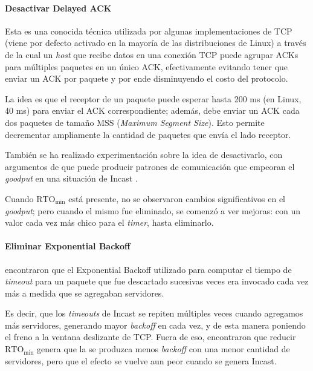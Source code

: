 \documentclass[runningheads,a4paper]{llncs}
\begin{document}
\paragraph{Desactivar Delayed ACK}

Esta es una conocida técnica utilizada por algunas implementaciones de TCP (viene por defecto activado en la mayoría de las distribuciones de Linux) a través de la cual un \textit{host} que recibe datos en una conexión TCP puede agrupar ACKs para múltiples paquetes en un único ACK, efectivamente evitando tener que enviar un ACK por paquete y por ende disminuyendo el costo del protocolo.

La idea es que el receptor de un paquete puede esperar hasta 200 ms (en Linux, 40 ms) para enviar el ACK correspondiente; además, debe enviar un ACK cada dos paquetes de tamaño MSS (\textit{Maximum Segment Size}). Esto permite decrementar ampliamente la cantidad de paquetes que envía el lado receptor.

También se ha realizado experimentación sobre la idea de desactivarlo, con argumentos de que puede producir patrones de comunicación que empeoran el \textit{goodput} en una situación de Incast \cite{Phanishayee_Throughput_2008} \cite{Vasudevan_FineGradinedRetrans_2009}.

Cuando $\text{RTO}_{\text{min}}$ está presente, no se observaron cambios significativos en el \textit{goodput}; pero cuando el mismo fue eliminado, se comenzó a ver mejoras: con un valor cada vez más chico para el \textit{timer}, hasta eliminarlo.

\paragraph{Eliminar Exponential Backoff}

\citet{Zheng_ExpBackoff_2011} encontraron que el Exponential Backoff utilizado para computar el tiempo de \textit{timeout} para un paquete que fue descartado sucesivas veces era invocado cada vez más a medida que se agregaban servidores. 

Es decir, que los \textit{timeouts} de Incast se repiten múltiples veces cuando agregamos más servidores, generando mayor \textit{backoff} en cada vez, y de esta manera poniendo el freno a la ventana deslizante de TCP. Fuera de eso, encontraron que reducir $\text{RTO}_{\text{min}}$ genera que la se produzca menos \textit{backoff} con una menor cantidad de servidores, pero que el efecto se vuelve aun peor cuando se genera Incast.
\end{document}
